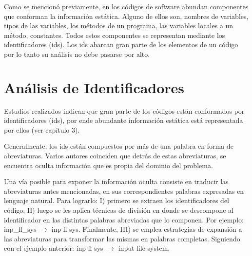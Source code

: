 Como se mencionó previamente, en los códigos de software abundan componentes que conforman la información estática. Alguno de ellos son, nombres de variables, tipos de las variables, los métodos de un programa, las variables locales a un método, constantes. Todos estos componentes se representan mediante los identificadores (ids). Los ids abarcan gran parte de los elementos de un código por lo tanto su análisis no debe pasarse por alto. 



\section{Análisis de Identificadores}

Estudios realizados \cite{DFPM05,DMDJ13,HDD06,FBL06} indican que gran parte de los códigos están conformados por identificadores (ids), por ende abundante información estática está representada por ellos (ver capítulo 3).

Generalmente, los ids están compuestos por más de una palabra en forma de abreviaturas. Varios autores coinciden \cite{BCPT99,LFBEX07,EZH08,EHPV09} que detrás de estas abreviaturas, se encuentra oculta información que es propia del dominio del problema.

Una vía posible para exponer la información oculta consiste en traducir las abreviaturas antes mencionadas, en sus correspondientes palabras expresadas en lenguaje natural.
Para lograrlo: I) primero se extraen los identificadores del código, II) luego se les aplica técnicas de división en donde se descompone al identificador en las distintas palabras abreviadas que lo componen. Por ejemplo: \textsf{inp\_fl\_sys} $\rightarrow$ \textsf{inp fl sys}. Finalmente, III) se emplea estrategias de expansión a las abreviaturas para transformar las mismas en palabras completas. Siguiendo con el ejemplo anterior: \textsf{inp fl sys} $\rightarrow$ \textsf{input file system}.


